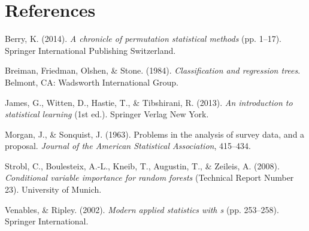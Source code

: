 \documentclass[12pt,twoside]{reedthesis}
\begin{document}
  \backmatter
  
  \chapter{References}\label{references}
  
  \noindent
  
  \setlength{\parindent}{-0.20in} \setlength{\leftskip}{0.20in}
  \setlength{\parskip}{8pt}
  
  \hypertarget{refs}{}
  \hypertarget{ref-berry}{}
  Berry, K. (2014). \emph{A chronicle of permutation statistical methods}
  (pp. 1--17). Springer International Publishing Switzerland.
  
  \hypertarget{ref-bibCART}{}
  Breiman, Friedman, Olshen, \& Stone. (1984). \emph{Classification and
  regression trees}. Belmont, CA: Wadsworth International Group.
  
  \hypertarget{ref-bibISL}{}
  James, G., Witten, D., Hastie, T., \& Tibshirani, R. (2013). \emph{An
  introduction to statistical learning} (1st ed.). Springer Verlag New
  York.
  
  \hypertarget{ref-morganSonquist}{}
  Morgan, J., \& Sonquist, J. (1963). Problems in the analysis of survey
  data, and a proposal. \emph{Journal of the American Statistical
  Association}, 415--434.
  
  \hypertarget{ref-bibstrobl2008}{}
  Strobl, C., Boulesteix, A.-L., Kneib, T., Augustin, T., \& Zeileis, A.
  (2008). \emph{Conditional variable importance for random forests}
  (Technical Report Number 23). University of Munich.
  
  \hypertarget{ref-MASS}{}
  Venables, \& Ripley. (2002). \emph{Modern applied statistics with s}
  (pp. 253--258). Springer International.


\end{document}
